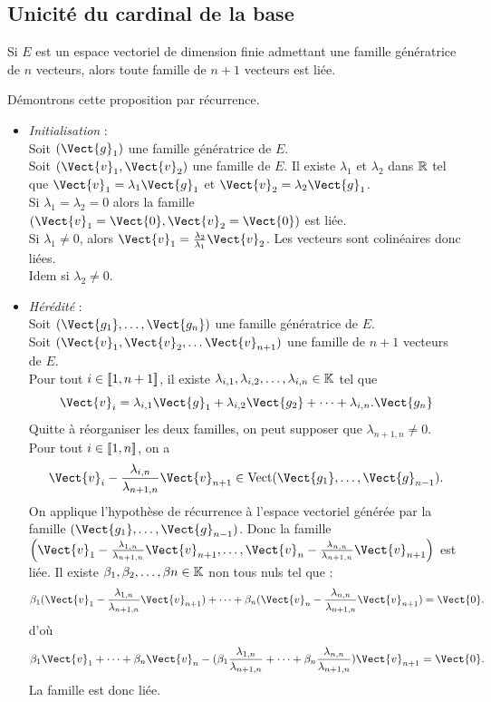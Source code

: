 \documentclass{book}
\begin{document}
\subsection{Unicité du cardinal de la base}
\begin{Proposition}
Si $E$ est un espace vectoriel de dimension finie admettant une famille génératrice de $n$ vecteurs, alors toute famille de $n+1$ vecteurs est liée.
\end{Proposition}
\begin{Demonstration}
Démontrons cette proposition par récurrence.
\begin{itemize}
\item \textit{Initialisation} :\\
Soit $(\Vect{g}_1)$ une famille génératrice de $E$.\\
Soit $(\Vect{v}_1,\Vect{v}_2)$ une famille de $E$. Il existe $\lambda_1$ et $\lambda_2$ dans $\mathbb{R}$ tel que $\Vect{v}_1=\lambda_1 \Vect{g}_1$ et $\Vect{v}_2=\lambda_2 \Vect{g}_1$.\\
Si  $\lambda_1=\lambda_2=0$ alors la famille $(\Vect{v}_1=\Vect{0},\Vect{v}_2=\Vect{0})$ est liée.\\
Si $\lambda_1\neq 0$, alors $\Vect{v}_1=\frac{\lambda_2}{\lambda_1}\Vect{v}_2$. Les vecteurs sont colinéaires donc liées.\\
Idem si $\lambda_2\neq 0$.\\
\item \textit{Hérédité} :\\
Soit $(\Vect{g_1},\dots,\Vect{g_n})$ une famille génératrice de $E$.\\
Soit $(\Vect{v}_1, \Vect{v}_2,\dots \Vect{v}_{n+1})$ une famille de $n+1$ vecteurs de $E$.\\
Pour tout $i\in \mathopen\lbrack\!\lbrack1,n+1 \mathclose\rbrack\!\rbrack$, il existe $\lambda_{i,1},\lambda_{i,2},\dots,\lambda_{i,n}\in\mathbb{K}$ tel que $$\Vect{v}_i=  \lambda_{i,1}\Vect{g}_1 + \lambda_{i,2}\Vect{g_2}+\dots+\lambda_{i,n}.\Vect{g_n}$$
Quitte à réorganiser les deux familles, on peut supposer que $\lambda_{n+1,n}\neq 0$. \\
Pour tout  $i\in \mathopen\lbrack\!\lbrack1,n \mathclose\rbrack\!\rbrack$, on a 
$$\Vect{v}_i-\frac{\lambda_{i,n}}{\lambda_{n+1,n}}\Vect{v}_{n+1}\in \Vectt(\Vect{g_1},\dots,\Vect{g}_{n-1}).$$
On applique l'hypothèse de récurrence à l'espace vectoriel générée par la famille $(\Vect{g_1},\dots,\Vect{g}_{n-1})$. Donc la famille $\left(\Vect{v}_1-\frac{\lambda_{1,n}}{\lambda_{n+1,n}}\Vect{v}_{n+1},\dots, \Vect{v}_n-\frac{\lambda_{n,n}}{\lambda_{n+1,n}}\Vect{v}_{n+1}\right)$ est liée. Il existe  $\beta_{1},\beta_{2},\dots,\beta{n}\in\mathbb{K}$ non tous nuls tel que :
$$\beta_1 (\Vect{v}_1-\frac{\lambda_{1,n}}{\lambda_{n+1,n}}\Vect{v}_{n+1})+\dots+\beta_n (\Vect{v}_n-\frac{\lambda_{n,n}}{\lambda_{n+1,n}}\Vect{v}_{n+1})=\Vect{0}.$$
d'où 
$$\beta_1\Vect{v}_1+\dots +\beta_n\Vect{v}_n - (\beta_1\frac{\lambda_{1,n}}{\lambda_{n+1,n}}+\dots +\beta_n\frac{\lambda_{n,n}}{\lambda_{n+1,n}})\Vect{v}_{n+1}=\Vect{0}.$$
La famille est donc liée. 
\end{itemize}
\end{Demonstration}
\end{document}
